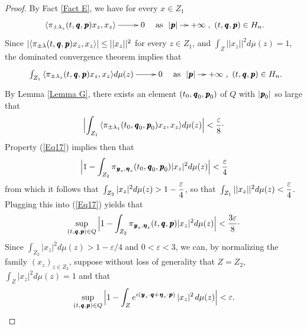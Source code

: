 \documentclass[11pt,english,a4paper]{smfart}
\numberwithin{equation}{section}
\theoremstyle{definition}
\begin{document}
\begin{proof}
By Fact \ref{Fact E}, we have for every $x\in Z_{1}$
\[
\xymatrix{
{\ensuremath{{\langle {\pi _{\pm\lambda_{z} }(t,{\mkern 1.5 mu\pmb{q}},{\mkern 1.5 mu\pmb{p}})x_{z}},{x_{z}}\rangle}}}\ar[r]&0
}\quad\textrm{as}\ \xymatrix@C=10pt{|{\mkern 1.5 mu\pmb{p}}|\ar[r]&+\infty },\ (t,{\mkern 1.5 mu\pmb{q}},{\mkern 1.5 mu\pmb{p}})\in H_{n}.
\]
Since $|{\ensuremath{{\langle {\pi _{\pm\lambda }(t,{\mkern 1.5 mu\pmb{q}},{\mkern 1.5 mu\pmb{p}})x_{z}},{x_{z}}\rangle}}}|\le||x_{z}||^{2}$ for every $z\in Z_{1}$, and 
$\int_{Z}||x_{z}||^{2}d\mu (z)=1$, the dominated convergence theorem implies that
\[
\xymatrix{{\displaystyle}\int_{Z_{1}}
{\ensuremath{{\langle {\pi _{\pm\lambda_{z} }(t,{\mkern 1.5 mu\pmb{q}},{\mkern 1.5 mu\pmb{p}})x_{z}},{x_{z}}\rangle}}}d\mu (z)\ar[r]&0
}\quad\textrm{as}\ \xymatrix@C=10pt{|{\mkern 1.5 mu\pmb{p}}|\ar[r]&+\infty },\ (t,{\mkern 1.5 mu\pmb{q}},{\mkern 1.5 mu\pmb{p}})\in H_{n}.
\]
By Lemma \ref{Lemma G}, there exists an element $(t_{0},{\mkern 1.5 mu\pmb{q}}_{0},{\mkern 1.5 mu\pmb{p}}_{0})$ of ${Q}$ with $|{\mkern 1.5 mu\pmb{p}}_{0}|$ so large that 
\[
\Bigl|\int_{Z_{1}}
{\ensuremath{{\langle {\pi _{\pm\lambda_{z} }(t_{0},{\mkern 1.5 mu\pmb{q}}_{0},{\mkern 1.5 mu\pmb{p}}_{0})x_{z}},{x_{z}}\rangle}}}d\mu (z)\Bigr|<\dfrac{\varepsilon }{8}\cdot 
\]
Property (\ref{Eq17}) implies then that
\[
\Bigl|1-\int_{Z_{2}}\pi _{{\mkern 1.5 mu\pmb{y}}_{z},{\mkern 1.5 mu\pmb{\eta}} _{z}}(t_{0},{\mkern 1.5 mu\pmb{q}}_{0},{\mkern 1.5 mu\pmb{p}}_{0})|x_{z}|^{2}d\mu (z)\Bigr|<\dfrac{\varepsilon }{4}
\] 
from which it follows that ${\displaystyle}\int_{Z_{2}}|x_{z}|^{2}d\mu (z)>1-\dfrac{\varepsilon }{4}$, so that
${\displaystyle}\int_{Z_{1}}||x_{z}||^{2}d\mu (z)<\dfrac{\varepsilon }{4}$.  Plugging this into (\ref{Eq17}) yields that
\[
\sup_{(t,{\mkern 1.5 mu\pmb{q}},{\mkern 1.5 mu\pmb{p}})\in{Q}}\,\Bigl|1-\int_{Z_{2}}\pi _{{\mkern 1.5 mu\pmb{y}}_{z},{\mkern 1.5 mu\pmb{\eta}} _{z}}(t,{\mkern 1.5 mu\pmb{q}},{\mkern 1.5 mu\pmb{p}})|x_{z}|^{2}d\mu (z)\Bigr|<\dfrac{3\varepsilon }{8}\cdot 
\]
Since $\int_{Z_{2}}|x_{z}|^{2}d\mu (z)>1-\varepsilon /4$ and $0<\varepsilon <3$, we can, by normalizing the family $(x_{z})_{z\in Z_{2}}$, suppose without loss of generality that $Z=Z_{2}$,  $\int_{Z}|x_{z}|^{2}d\mu (z)=1$ and that
\begin{equation}\label{Eq18}
 \sup_{(t,{\mkern 1.5 mu\pmb{q}},{\mkern 1.5 mu\pmb{p}})\in{Q}}\,\Bigl|1-\int_{Z}e^{i({\mkern 1.5 mu\pmb{y}}_{z}\cdot{\mkern 1.5 mu\pmb{q}}+{\mkern 1.5 mu\pmb{\eta}} _{z}\cdot{\mkern 1.5 mu\pmb{p}})}\,|x_{z}|^{2\,}d\mu (z)\Bigr|<\varepsilon . 
\end{equation}

\end{proof}
\end{document}
